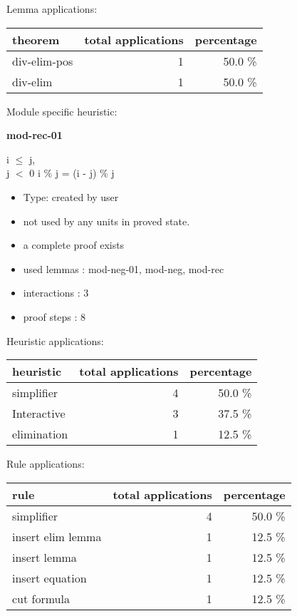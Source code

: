 \documentclass[a4paper]{article}
\begin{document}
Lemma applications:

\begin{supertabular}{l|r|r}
theorem	        & total applications & percentage \\ \hline
div-elim-pos & 1 & 50.0 \% \\
div-elim & 1 & 50.0 \% \\

\end{supertabular}

Module specific heuristic:

\pagebreak

{\LARGE\bf mod-rec-01}\label{lemma-mod-rec-01}

\medskip

i $\le$ j, \\
j $<$ 0 \Fol i \% j = (i - j) \% j

\begin{itemize}

\item Type: created by user

\item not used by any units in proved state.
\item       a complete proof exists
\item       used lemmas  : mod-neg-01, mod-neg, mod-rec
\item       interactions : 3
\item       proof steps  : 8
\end{itemize}

\medskip


Heuristic applications:

\begin{supertabular}{l|r|r}
heuristic	& total applications & percentage \\ \hline
simplifier & 4 & 50.0 \% \\
Interactive & 3 & 37.5 \% \\
elimination & 1 & 12.5 \% \\

\end{supertabular}

Rule applications:

\begin{supertabular}{l|r|r}
rule	        & total applications & percentage \\ \hline
simplifier & 4 & 50.0 \% \\
insert elim lemma & 1 & 12.5 \% \\
insert lemma & 1 & 12.5 \% \\
insert equation & 1 & 12.5 \% \\
cut formula & 1 & 12.5 \% \\

\end{supertabular}
\end{document}
